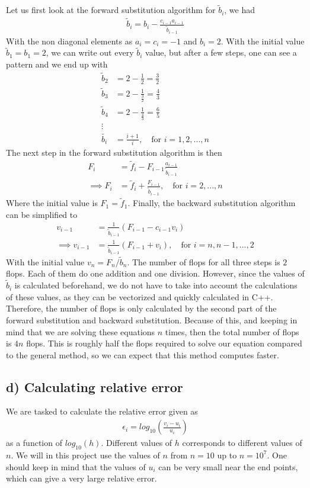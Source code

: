 \documentclass[12pt]{article}
\begin{document}
Let us first look at the forward substitution algorithm for $\tilde{b}_i$, we had
\begin{align}
\tilde{b}_i = b_i - \frac{c_{i-1}a_{i-1}}{\tilde{b}_{i-1}}
\end{align}
With the non diagonal elements as $a_i = c_i = -1$ and $b_i = 2$. With the initial value $\tilde{b}_1 = b_1 = 2$, we can write out every $\tilde{b}_i$ value, but after a few steps, one can see a pattern and we end up with
\begin{align}
\tilde{b}_2 &= 2 - \frac{1}{2} = \frac{3}{2} \nonumber \\
\tilde{b}_3 &= 2 - \frac{1}{\frac{3}{2}} = \frac{4}{3} \nonumber \\
\tilde{b}_4 &= 2 - \frac{1}{\frac{4}{3}} = \frac{6}{5} \nonumber \\
\vdots \nonumber \\
\tilde{b_i} &= \frac{i+1}{i}, \quad \text{for } i = 1,2,...,n
\end{align}
The next step in the forward substitution algorithm is then
\begin{align}
F_i &= \tilde{f}_i - F_{i-1}\frac{a_{i-1}}{\tilde{b}_{i-1}}  \nonumber \\
\implies F_i &= \tilde{f}_i + \frac{F_{i-1}}{\tilde{b}_{i-1}}, \quad \text{for } i=2,...,n
\end{align}
Where the initial value is $F_1 = \tilde{f}_1$. Finally, the backward substitution algorithm can be simplified to
\begin{align}
v_{i-1} &= \frac{1}{\tilde{b}_{i-1}}(F_{i-1}-c_{i-1}v_i) \nonumber \\
\implies v_{i-1} &= \frac{1}{\tilde{b}_{i-1}}(F_{i-1} + v_i), \quad \text{for } i = n, n-1, ..., 2
\end{align}
With the initial value $v_{n} = F_n/\tilde{b}_n$. The number of flops for all three steps is $2$ flops. Each of them do one addition and one division. However, since the values of $\tilde{b}_i$ is calculated beforehand, we do not have to take into account the calculations of these values, as they can be vectorized and quickly calculated in C++. Therefore, the number of flops is only calculated by the second part of the forward substitution and backward substitution. Because of this, and keeping in mind that we are solving these equations $n$ times, then the total number of flops is $4n$ flops. This is roughly half the flops required to solve our equation compared to the general method, so we can expect that this method computes faster.

\subsection*{d) Calculating relative error}
We are tasked to calculate the relative error given as
\begin{align*}
\epsilon_i = log_{10}\left(\frac{v_i - u_i}{u_i} \right)
\end{align*}
as a function of $log_{10}(h)$. Different values of $h$ corresponds to different values of $n$. We will in this project use the values of $n$ from $n=10$ up to $n=10^7$. One should keep in mind that the values of $u_i$ can be very small near the end points, which can give a very large relative error.
\end{document}
